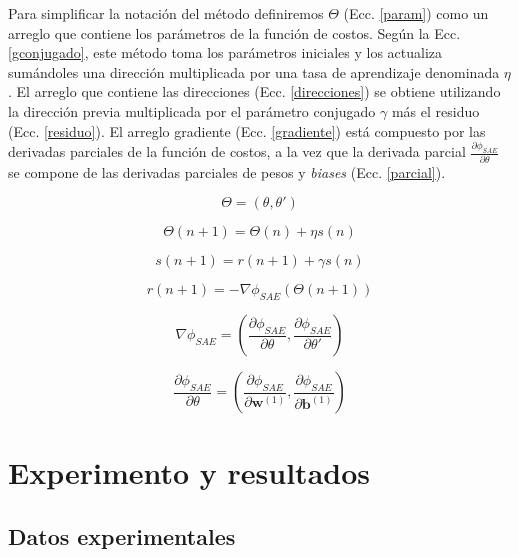 \documentclass[12pt]{article}%
\begin{document}
Para simplificar la notación del método definiremos $\Theta$ (Ecc. \ref{param}) como un arreglo que contiene los parámetros de la función de costos. Según la Ecc. \ref{gconjugado}, este método toma los parámetros iniciales y los actualiza sumándoles una dirección multiplicada por una tasa de aprendizaje denominada $\eta$. El arreglo que contiene las direcciones (Ecc. \ref{direcciones}) se obtiene utilizando la dirección previa multiplicada por el parámetro conjugado $\gamma$ más el residuo (Ecc. \ref{residuo}). El arreglo gradiente (Ecc. \ref{gradiente}) está compuesto por las derivadas parciales de la función de costos, a la vez que la derivada parcial $\frac{\partial{\phi_{SAE}}}{\partial{\theta}}$ se compone de las derivadas parciales de pesos y \textit{biases} (Ecc. \ref{parcial}).

\begin{equation}
\label{param}
\Theta = (\theta,\theta')
\end{equation} 

\begin{equation}
\label{gconjugado}
\Theta(n+1)=\Theta(n)+{\eta}s(n)
\end{equation}

\begin{equation}
\label{direcciones}
s(n+1)=r(n+1)+\gamma{s(n)}
\end{equation} 

\begin{equation}
\label{residuo}
r(n+1) = -\nabla{\phi_{SAE}(\Theta(n+1))}
\end{equation} 

\begin{equation}
\label{gradiente}
\nabla{\phi_{SAE}} = \left(\frac{\partial{\phi_{SAE}}}{\partial{\theta}},\frac{\partial{\phi_{SAE}}}{\partial{\theta'}}\right)
\end{equation}

\begin{equation}
\label{parcial}
\frac{\partial{\phi_{SAE}}}{\partial{\theta}} = \left(\frac{\partial{\phi_{SAE}}}{\partial{\textbf{w}^{(1)}}},\frac{\partial{\phi_{SAE}}}{\partial{\textbf{b}^{(1)}}}\right)
\end{equation}  

\section{Experimento y resultados}
\label{sec:exp}

\subsection{Datos experimentales}
\label{sec:datos}
\end{document}
